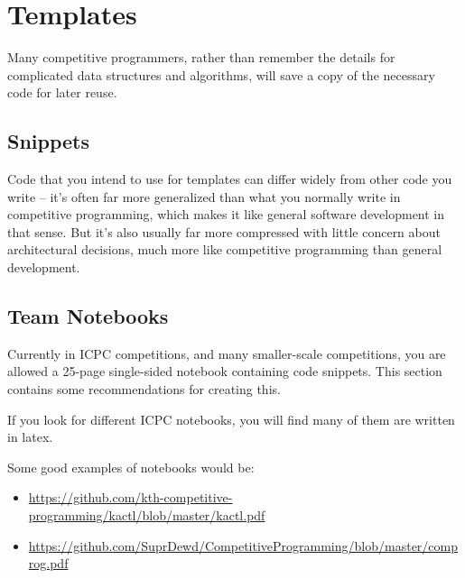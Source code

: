 \section{Templates}

Many competitive programmers, rather than remember the details for complicated data structures and algorithms, will save a copy of the necessary code for later reuse.

\subsection{Snippets}

Code that you intend to use for templates can differ widely from other code you write -- it's often far more generalized than what you normally write in competitive programming, which makes it like general software development in that sense. But it's also usually far more compressed with little concern about architectural decisions, much more like competitive programming than general development.

\subsection{Team Notebooks}
 

Currently in ICPC competitions, and many smaller-scale competitions, you are allowed a 25-page single-sided notebook containing code snippets. This section contains some recommendations for creating this.

If you look for different ICPC notebooks, you will find many of them are written in latex.

Some good examples of notebooks would be:

\begin{itemize}
\item \url{https://github.com/kth-competitive-programming/kactl/blob/master/kactl.pdf}
\item \url{https://github.com/SuprDewd/CompetitiveProgramming/blob/master/comprog.pdf}
\end{itemize}
